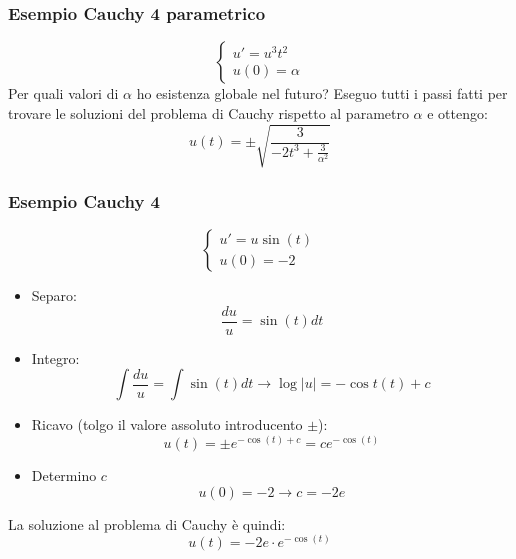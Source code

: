 \subsubsection*{Esempio Cauchy 4 parametrico}
\[
	\begin{cases}
		u' = u^3 t^2 \\
		u\left( 0 \right) = \alpha
	\end{cases}
\]
Per quali valori di $ \alpha  $ ho esistenza globale nel futuro?
\vskip3mm
Eseguo tutti i passi fatti per trovare le soluzioni del problema di Cauchy rispetto al parametro $ \alpha  $ e ottengo:
\[
	u\left( t \right) = \pm \sqrt{\frac{3}{-2t^3 + \frac{3}{\alpha ^2}}}
\]
\subsubsection*{Esempio Cauchy 4}
\[
	\begin{cases}
		u'= u \sin \left( t \right) \\
		u\left( 0 \right) = -2
	\end{cases}
\]
\begin{itemize}
	\item Separo:
	      \[
		      \frac{du}{u}= \sin \left( t \right) dt
	      \]
	\item Integro:
	      \[
		      \int \frac{du}{u}= \int \sin \left( t \right) dt \rightarrow \log \left| u\right|= - \cos t\left( t \right)  + c
	      \]
	\item Ricavo (tolgo il valore assoluto introducento $ \pm $):
	      \[
		      u\left( t \right) = \pm e^{-\cos \left( t \right)  + c}= c e ^{-\cos \left( t \right) }
	      \]
	\item Determino $ c $
	      \[
		      u\left( 0 \right) = -2 \rightarrow c = -2e
	      \]
\end{itemize}
La soluzione al problema di Cauchy è quindi:
\[
	u\left( t \right) = -2e \cdot e^{-\cos \left( t \right) }
\]
